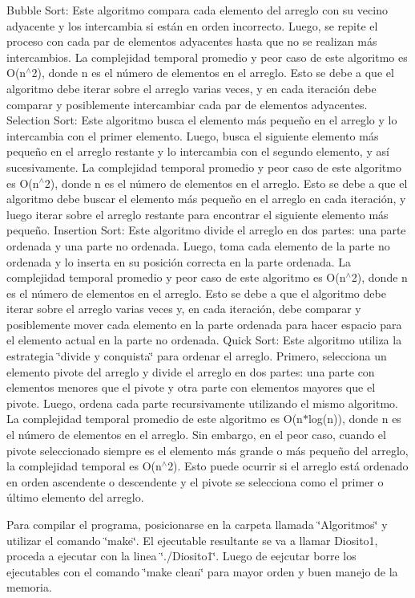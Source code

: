 Bubble Sort\+: Este algoritmo compara cada elemento del arreglo con su vecino adyacente y los intercambia si están en orden incorrecto. Luego, se repite el proceso con cada par de elementos adyacentes hasta que no se realizan más intercambios. La complejidad temporal promedio y peor caso de este algoritmo es O(n$^\wedge$2), donde n es el número de elementos en el arreglo. Esto se debe a que el algoritmo debe iterar sobre el arreglo varias veces, y en cada iteración debe comparar y posiblemente intercambiar cada par de elementos adyacentes. Selection Sort\+: Este algoritmo busca el elemento más pequeño en el arreglo y lo intercambia con el primer elemento. Luego, busca el siguiente elemento más pequeño en el arreglo restante y lo intercambia con el segundo elemento, y así sucesivamente. La complejidad temporal promedio y peor caso de este algoritmo es O(n$^\wedge$2), donde n es el número de elementos en el arreglo. Esto se debe a que el algoritmo debe buscar el elemento más pequeño en el arreglo en cada iteración, y luego iterar sobre el arreglo restante para encontrar el siguiente elemento más pequeño. Insertion Sort\+: Este algoritmo divide el arreglo en dos partes\+: una parte ordenada y una parte no ordenada. Luego, toma cada elemento de la parte no ordenada y lo inserta en su posición correcta en la parte ordenada. La complejidad temporal promedio y peor caso de este algoritmo es O(n$^\wedge$2), donde n es el número de elementos en el arreglo. Esto se debe a que el algoritmo debe iterar sobre el arreglo varias veces y, en cada iteración, debe comparar y posiblemente mover cada elemento en la parte ordenada para hacer espacio para el elemento actual en la parte no ordenada. Quick Sort\+: Este algoritmo utiliza la estrategia \char`\"{}divide y conquista\char`\"{} para ordenar el arreglo. Primero, selecciona un elemento pivote del arreglo y divide el arreglo en dos partes\+: una parte con elementos menores que el pivote y otra parte con elementos mayores que el pivote. Luego, ordena cada parte recursivamente utilizando el mismo algoritmo. La complejidad temporal promedio de este algoritmo es O(n$\ast$log(n)), donde n es el número de elementos en el arreglo. Sin embargo, en el peor caso, cuando el pivote seleccionado siempre es el elemento más grande o más pequeño del arreglo, la complejidad temporal es O(n$^\wedge$2). Esto puede ocurrir si el arreglo está ordenado en orden ascendente o descendente y el pivote se selecciona como el primer o último elemento del arreglo.

Para compilar el programa, posicionarse en la carpeta llamada \char`\"{}\+Algoritmos\char`\"{} y utilizar el comando \char`\"{}make\char`\"{}. El ejecutable resultante se va a llamar Diosito1, proceda a ejecutar con la linea \char`\"{}./\+Diosito1\char`\"{}. Luego de eejcutar borre los ejecutables con el comando \char`\"{}make clean\char`\"{} para mayor orden y buen manejo de la memoria. 